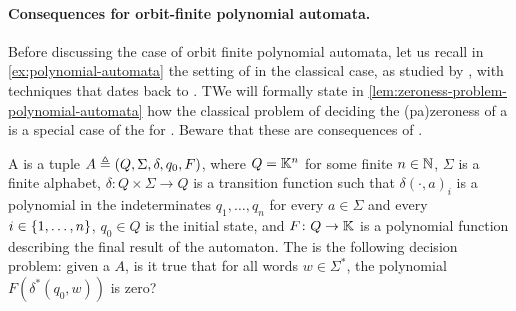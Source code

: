 \paragraph{Consequences for orbit-finite polynomial automata.} Before
discussing the case of orbit finite polynomial automata, let us recall in
\cref{ex:polynomial-automata}
the
setting of  in the classical case, as studied by
\cite{BEDUSHWO17}, with techniques that dates back to \cite{MULSEI02}. TWe will
formally state in \cref{lem:zeroness-problem-polynomial-automata}
how the classical problem of deciding the \kl(pa){zeroness} of a
 is a special case of the  for . Beware that
these are consequences of \cite{JGL10}.

\begin{definition}
  \label{ex:polynomial-automata}
  A  is a tuple $A \triangleq (Q, \Sigma, \delta, q_0, F)$,
  where $Q = \mathbb{K}^n$ for some finite $n \in \mathbb{N}$, $\Sigma$ is a finite alphabet,
  $\delta \colon Q \times \Sigma \to Q$ is a transition function such that 
  $\delta(\cdot,a)_i$ is a polynomial in the indeterminates $q_1, \dots, q_n$ for every
  $a \in \Sigma$ and every $i \in \{ 1, \dots, n \}$, $q_0 \in Q$ is the initial state,
  and $F \colon Q \to \mathbb{K}$ is a polynomial function describing the final result of the 
  automaton.
  The  is the following decision problem:
  given a  $A$, is it true that 
  for all words $w \in \Sigma^*$, the polynomial $F(\delta^*(q_0, w))$ is zero?
\end{definition}

